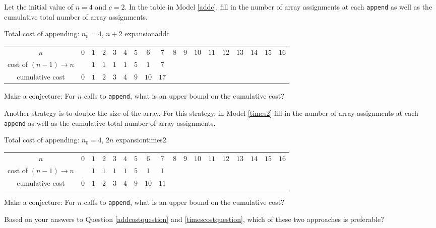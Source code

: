 \documentclass{tufte-handout}
\begin{document}
\begin{questions}
Let the initial value of $n = 4$ and $c = 2$. In the table in Model \ref{addc}, fill in the number of array assignments at each \verb|append| as well as the cumulative total number of array assignments.
  
\begin{model*}{Total cost of appending: $n_0 = 4$, $n + 2$ expansion}{addc}
  \centering
  \begin{tabular}{c|ccccccccccccccccc}
    $n$ & $0$ & $1$ & $2$ & $3$ & $4$ & $5$ & $6$ & $7$ & $8$ & $9$ & $10$
    & $11$ & $12$ & $13$ & $14$ & $15$ & $16$ \\[8pt]
    cost of $(n-1) \to n$ &  & $1$ & $1$ & $1$ & $1$ & $5$ & $1$ & $7$ &  &  &
    &  &  &  &  &  &  \\[8pt]
    cumulative cost & $0$ & $1$ & $2$ & $3$ & $4$ & $9$ & $10$ & $17$ &
    &  &  &  &  &  &  &  &
  \end{tabular}
  \label{addc}
\end{model*}

\item Make a conjecture: For $n$ calls to \verb|append|, what is an upper bound on the cumulative cost? \label{addcostquestion}

\item Another strategy is to double the size of the array. For this strategy, in Model \ref{times2} fill in the number of array assignments at each \verb|append| as well as the cumulative total number of array assignments.
  
\begin{model*}{Total cost of appending:  $n_0 = 4$, $2n$ expansion}{times2}
  \centering
  \begin{tabular}{c|ccccccccccccccccc}
    $n$ & $0$ & $1$ & $2$ & $3$ & $4$ & $5$ & $6$ & $7$ & $8$ & $9$ & $10$
    & $11$ & $12$ & $13$ & $14$ & $15$ & $16$ \\[8pt]
    cost of $(n-1) \to n$ &  & $1$ & $1$ & $1$ & $1$ & $5$ & $1$ & $1$ &  &  &
    &  &  &  &  &  &  \\[8pt]
    cumulative cost & $0$ & $1$ & $2$ & $3$ & $4$ & $9$ & $10$ & $11$ &
    &  &  &  &  &  &  &  &
  \end{tabular}
  \label{times2}
\end{model*}

\item Make a conjecture: For $n$ calls to \verb|append|, what is an upper bound on the cumulative cost? \label{timescostquestion}

\item Based on your answers to Question \ref{addcostquestion} and \ref{timescostquestion}, which of these two approaches is preferable?


\end{questions}
\end{document}
